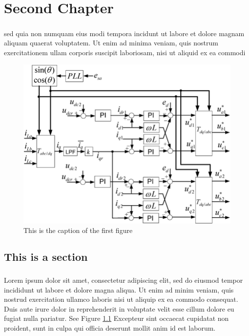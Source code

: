\chapter{Second Chapter}
    \paragraph{}
    sed quia non numquam eius modi tempora incidunt ut labore et dolore magnam aliquam quaerat voluptatem. Ut enim ad minima
    veniam, quis nostrum exercitationem ullam corporis suscipit laboriosam, nisi ut aliquid ex ea commodi

    \begin{figure}[h!]
        \centering
        \includegraphics[scale=0.3]{assets/figures/figure_1.png}
        \caption{This is the caption of the first figure}
        \label{fig:figure of something}
    \end{figure}
    
    \section{This is a section}
    \paragraph{}
    Lorem ipsum dolor sit amet, consectetur adipiscing elit, sed do eiusmod tempor incididunt ut labore et dolore magna aliqua.
    Ut enim ad minim veniam, quis nostrud exercitation ullamco laboris nisi ut aliquip ex ea commodo consequat. Duis aute irure
    dolor in reprehenderit in voluptate velit esse cillum dolore eu fugiat nulla pariatur. See Figure \ref{fig:figure of something}
    Excepteur sint occaecat cupidatat non proident, sunt in culpa qui officia deserunt mollit anim id est laborum.

